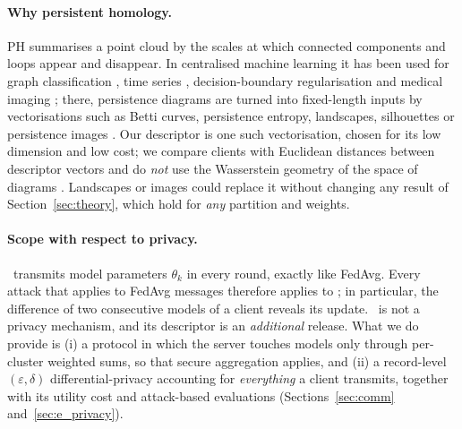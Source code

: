 \paragraph{Why persistent homology.}
PH summarises a point cloud by the scales at which connected components and loops appear and
disappear. In centralised machine learning it has been used for graph classification
\citep{hofer2017deep}, time series \citep{umeda2017time}, decision-boundary regularisation
\citep{chen2019topological} and medical imaging \citep{clough2020topological,abaach2023geotop,gouiaa2024taelcore};
there, persistence diagrams are turned into fixed-length inputs by vectorisations such as
Betti curves, persistence entropy, landscapes, silhouettes or persistence images
\citep{giusti2015clique,chintakunta2015entropy,chazal2021introduction,bubenik2015statistical,chazal2014stochastic,adams2017persistence,reininghaus2015stable}.
Our descriptor is one such vectorisation, chosen for its low dimension and low cost; we
compare clients with Euclidean distances between descriptor vectors and do \emph{not} use
the Wasserstein geometry of the space of diagrams \citep{mileyko2011probability,turner2014frechet}.
Landscapes or images could replace it without changing any result of
Section~\ref{sec:theory}, which hold for \emph{any} partition and weights.

\paragraph{Scope with respect to privacy.}
\ptopofl\ transmits model parameters $\theta_k$ in every round, exactly like FedAvg. Every
attack that applies to FedAvg messages therefore applies to \ptopofl; in particular, the
difference of two consecutive models of a client reveals its update. \ptopofl\ is not a
privacy mechanism, and its descriptor is an \emph{additional} release. What we do provide is
(i) a protocol in which the server touches models only through per-cluster weighted sums,
so that secure aggregation applies, and (ii) a record-level $(\varepsilon,\delta)$
differential-privacy accounting for \emph{everything} a client transmits, together with its
utility cost and attack-based evaluations (Sections~\ref{sec:comm} and~\ref{sec:e_privacy}).

